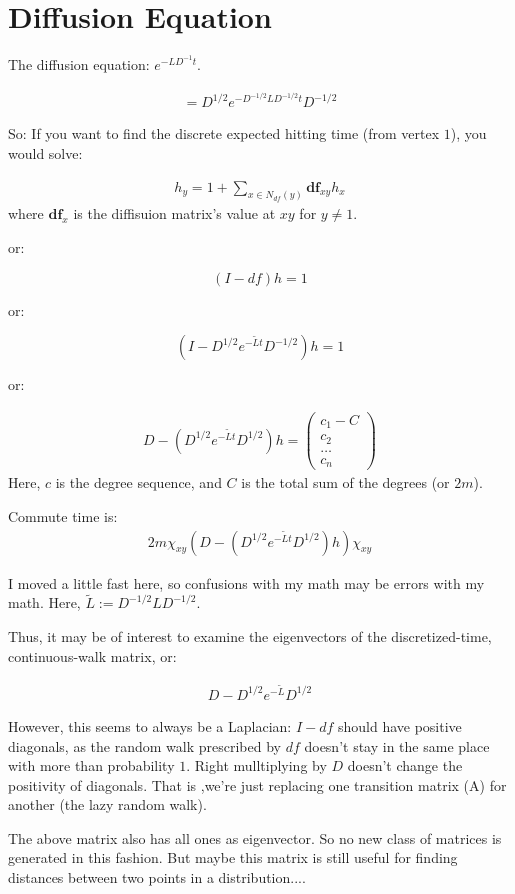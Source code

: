 \section{Diffusion Equation}
The diffusion equation: $e^{-LD^{-1}t}$.

\begin{align}
= D^{1/2} e^{-D^{-1/2}L D^{-1/2} t} D^{-1/2}
\end{align}

So: If you want to find the discrete expected hitting time (from vertex
    $1$), you would
solve:

\begin{align}
h_y = 1 + \sum_{x \in N_{df}(y)} \textbf{df}_{xy} h_x
\end{align}
where $\textbf{df}_x$ is the diffisuion matrix's value at $xy$ for $y \not= 1$.

or:

\[(I - {df})h = 1\]

or:

\[(I - D^{1/2} e^{-\tilde{L}t} D^{-1/2}) h = 1\]

or: 

\begin{align}
D - (D^{1/2} e^{-\tilde{L}t} D^{1/2}) h =
  \begin{pmatrix} c_1 - C \\ c_2
  \\ \ldots \\ c_n  \end{pmatrix}
\end{align}
Here, $c$ is the degree sequence, and $C$ is the total sum of the
degrees (or $2m$).

Commute time is:
\begin{align}
2m \chi_{xy} (D - (D^{1/2} e^{-\tilde{L}t} D^{1/2}) h) \chi_{xy}
\end{align}

I moved a little fast here, so confusions with my math may be errors
with my math. Here, $\tilde{L} := D^{-1/2}LD^{-1/2}$.

Thus, it may be of interest to examine the eigenvectors of the
discretized-time, continuous-walk matrix, or:

\begin{align}
D - D^{1/2} e^{-\tilde{L}} D^{1/2}
\end{align}

However, this seems to always be a Laplacian: $I - df$ should have
positive diagonals, as the random walk prescribed by $df$ doesn't stay in the same place with more
than probability $1$. Right mulltiplying by $D$ doesn't change the
positivity of diagonals. That is ,we're just replacing one transition
matrix (A) for another (the lazy random walk).

The above matrix also has all ones as eigenvector. So no new class of
matrices is generated in this fashion. But maybe this matrix is still
useful for finding distances between two points in a distribution....
